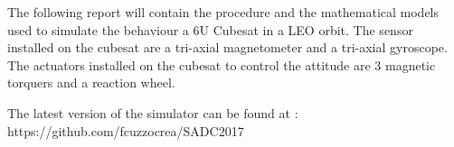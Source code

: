 The following report will contain the procedure and the mathematical models used to simulate the behaviour a 6U Cubesat in a LEO orbit.
The sensor installed on the cubesat are a tri-axial magnetometer and a tri-axial gyroscope. 
The actuators installed on the cubesat to control the attitude are 3 magnetic torquers and a reaction wheel.

The latest version of the simulator can be found at : https://github.com/fcuzzocrea/SADC2017
